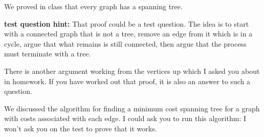 \documentclass[12pt]{article}
\begin{document}
We proved in class that every graph has a spanning tree.  

{\bf test question hint:}  That proof could be a test question.  The idea is to start with a connected graph that is not a tree, remove an edge from it which is in a cycle, argue that what remains is still connected, then argue that the process must terminate with a tree.

There is another argument working from the vertices up which I asked you about in homework.  If you have worked out that proof, it is also an answer to such a question.

We discussed the algorithm for finding a minimum cost spanning tree for a graph with costs associated with each edge.  I could ask you to run this algorithm:  I won't ask you on the test to prove that it works.
\end{document}
